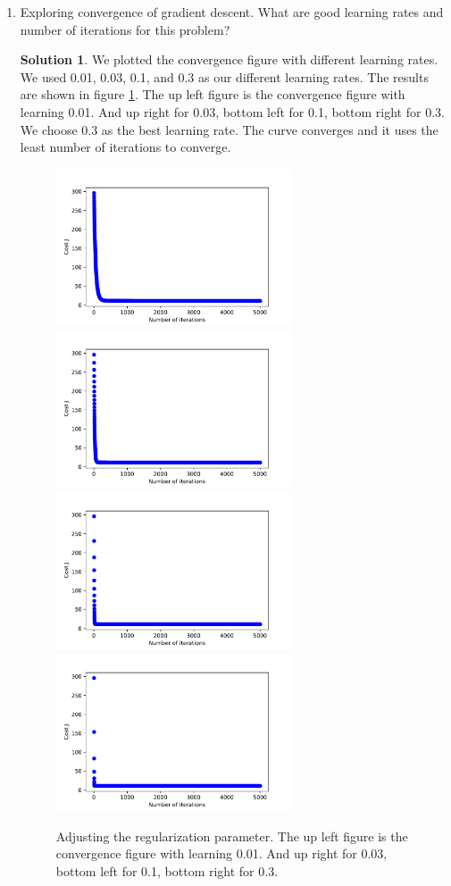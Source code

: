 \documentclass[]{book}
\theoremstyle{definition}
\newtheorem*{soln}{Solution}
\begin{document}
\begin{enumerate}
	\item Exploring convergence of gradient descent. What are good learning rates and number of iterations for this problem?
	\begin{soln}
		We plotted the convergence figure with different learning rates. We used 0.01, 0.03, 0.1, and 0.3 as our different learning rates. The results are shown in figure \ref{fig:5}. The up left figure is the convergence figure with learning 0.01. And up right for 0.03, bottom left for 0.1, bottom right for 0.3. We choose 0.3 as the best learning rate. The curve converges and it uses the least number of iterations to converge.
		\begin{minipage}{\linewidth}
			\begin{figure}[H]
				\centering
				\includegraphics[width=7cm]{fig_rl_e-2.pdf}
				\includegraphics[width=7cm]{fig_rl_3e-2.pdf}
				\includegraphics[width=7cm]{fig_rl_e-1.pdf}
				\includegraphics[width=7cm]{fig_rl_3e-1.pdf}
				\caption{Adjusting the regularization parameter. The up left figure is the convergence figure with learning 0.01. And up right for 0.03, bottom left for 0.1, bottom right for 0.3.}
				\label{fig:5}
			\end{figure} 
		\end{minipage} 
		

\end{soln}
\end{enumerate}
\end{document}

